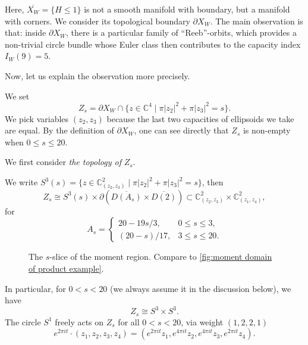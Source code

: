 \documentclass[11pt]{amsart}
\numberwithin{equation}{section}
\theoremstyle{plain}
\theoremstyle{definition}
\theoremstyle{remark}
\newcommand{\bC} { {\mathbb{C}}}
\begin{document}
Here, $\overline{X_{W}}=\{H\leq 1\}$ is not a smooth manifold with boundary, but a manifold with corners. We consider its topological boundary $\partial X_{W}$. The main observation is that: inside $\partial X_{W}$, there is a particular family of ``Reeb''-orbits, which provides a non-trivial circle bundle whose Euler class then contributes to the capacity index $I_W(9)=5$.

Now, let us explain the observation more precisely.


We set 
\[Z_s=\partial X_{W}\cap \{z \in \bC^4\mid \pi|z_2|^2+\pi|z_3|^2=s\}.\]
We pick variables $(z_2,z_3)$ because the last two capacities of ellipsoids we take are equal. By the definition of $\partial X_{W}$, one can see directly that $ Z_s$ is non-empty when $ 0\leq s\leq 20$.

We first consider \textit{the topology of  }$Z_s$.

We write $S^3(s)=\{z \in \bC^2_{(z_2,z_3)} \mid \pi|z_2|^2+\pi|z_3|^2=s\}$, then
 \[Z_{s}\cong S^3(s)\times \partial (\overline{D(A_s)}\times \overline{D(2)} ) \subset \bC^2_{(z_2,z_3)} \times  \bC^2_{(z_1,z_4)},\]
    for 
\begin{equation}\label{equation: formula of a(s) in geometry of product example}
    A_s=\begin{cases}
        20-19s/3,& 0\leq s \leq 3,\\
        (20-s)/17,& 3\leq s \leq 20.
    \end{cases}
\end{equation}
\begin{figure}[htbp]
    \centering
{}
    \caption{The $s$-slice of the moment region. Compare to \autoref{fig:moment domain of product example}.}
    \label{fig:s-slice moment domain of product example}
\end{figure}

In particular, for $0<s<20$ (we always assume it in the discussion below), we have
\[Z_s\cong S^3\times S^3.\]
The circle $S^1$ freely acts on $Z_s$ for all $0<s<20$, via weight $(1,2,2,1)$
\[e^{2\pi i t} \cdot (z_1,z_2,z_3,z_4)= (e^{2\pi i t} z_1,e^{4\pi i t} z_2,e^{4\pi i t} z_3,e^{2\pi i t} z_4).\]
\end{document}
